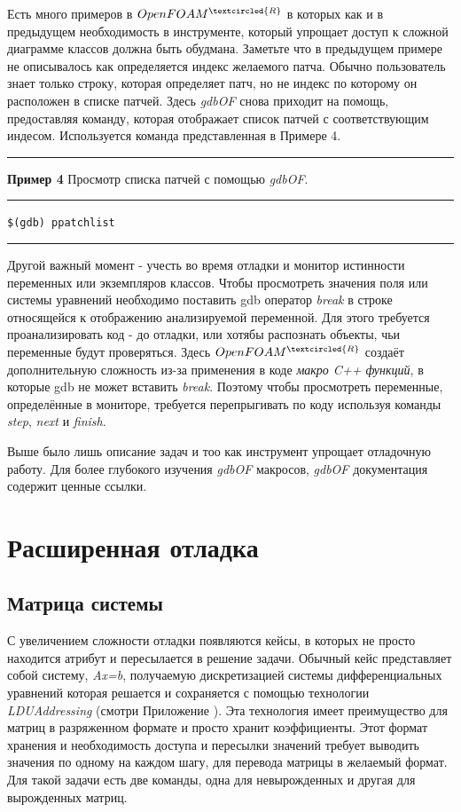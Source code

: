 \documentclass[a4paper,10pt]{book}
\begin{document}
Есть много примеров в $OpenFOAM^{\tiny\textcircled{R}}$ в которых как и в предыдущем необходимость в инструменте, который
упрощает доступ к сложной диаграмме классов должна быть обудмана. Заметьте что в предыдущем примере не описывалось как определяется
индекс желаемого патча. Обычно пользователь знает только строку, которая определяет патч, но не индекс по которому он расположен
в списке патчей. Здесь \textit{gdbOF} снова приходит на помощь, предоставляя команду, которая отображает список патчей с  
соответствующим индесом. Используется команда представленная в Примере 4.

\vspace{2 mm}
\hrule\smallskip
\textbf{Пример 4} Просмотр списка патчей с помощью \textit{gdbOF}.
\smallskip\hrule
\vspace{2 mm}
\texttt{\$(gdb) ppatchlist}
\vspace{2 mm}
\smallskip\hrule
\vspace{5 mm}

Другой важный момент - учесть во время отладки и монитор истинности переменных или экземпляров классов. Чтобы просмотреть значения
поля или системы уравнений необходимо поставить gdb оператор \textit{break} в строке относящейся к отображению анализируемой
переменной. Для этого требуется проанализировать код - до отладки, или хотябы распознать объекты, чьи переменные будут проверяться.
Здесь $OpenFOAM^{\tiny\textcircled{R}}$ создаёт дополнительную сложность из-за применения в коде \textit{макро C++ функций},
в которые gdb не может вставить \textit{break}. Поэтому чтобы просмотреть переменные, определённые в мониторе, требуется
перепрыгивать по коду используя команды \textit{step}, \textit{next} и \textit{finish}.

\vspace{2 mm}

Выше было лишь описание задач и тоо как инструмент упрощает отладочную работу. Для более глубокого изучения \textit{gdbOF} макросов,
\textit{gdbOF} документация содержит ценные ссылки.

\chapter{Расширенная отладка}

\section{Матрица системы}
\label{sec:3.1}
С увеличением сложности отладки появляются кейсы, в которых не просто находится атрибут и пересылается в решение задачи. Обычный кейс
представляет собой систему, \textit{Ax=b}, получаемую дискретизацией системы дифференциальных уравнений которая решается и сохраняется
с помощью технологии \textit{LDUAddressing} (смотри Приложение ). Эта технология имеет преимущество для матриц
в разряженном формате и просто хранит коэффициенты. Этот формат хранения и необходимость доступа и пересылки значений требует
выводить значения по одному на каждом шагу, для перевода матрицы в желаемый формат. Для такой задачи есть две команды, одна для невырожденных
и другая для вырожденных матриц.
\end{document}
